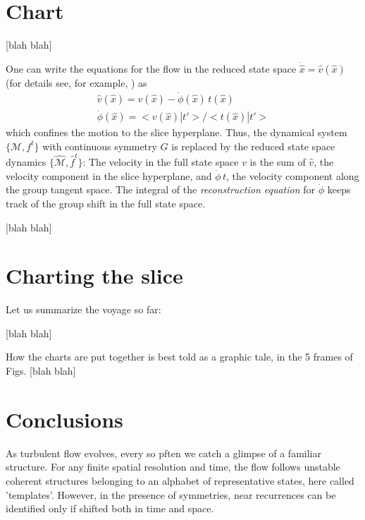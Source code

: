 \documentclass{article}
\begin{document}
\section{Chart}
\label{s:slice}

 [blah blah]

One can write the equations for the flow in the reduced state space
$\dot{\hat{x}} = \hat{v}(\hat{x})$ (for details see, for example,
\cite{DasBuch}) as
\begin{align}
\hat{v}(\hat{x}) = v(\hat{x})-\dot{\phi}(\hat{x}) \, t(\hat{x})
\label{2modesEqMotMFrame}\\
\dot{\phi}(\hat{x}) = <v(\hat{x})|t'>
                       /<t(\hat{x})|t'>
\label{2modesreconstrEq}
\end{align}
which confines the motion to the slice hyperplane. Thus, the dynamical
system $\{\mathcal{M},f^t\}$ with continuous symmetry $G$ is replaced by
the reduced state space dynamics $\{\hat{\mathcal{M}},\hat{f}^t\}$: The velocity in the
full state space $v$ is the sum of $\hat{v}$, the velocity component in
the slice hyperplane, and $\dot{\phi}\,t$, the velocity
component along the group tangent space. The integral of the {\em
reconstruction equation} for $\dot{\phi}$ keeps track of the group
shift in the full state space.


 [blah blah]

\section{Charting the slice}
\label{s:chart}

Let us summarize the voyage so far:

 [blah blah]


How the charts are put together is best told as a graphic tale, in the 5
frames of Figs.  [blah blah]



\section{Conclusions}
\label{s:concl}
As turbulent flow evolves, every so pften we catch a glimpse of a familiar structure. For any finite spatial resolution and time, the flow follows unstable coherent structures belonging to an alphabet of representative states, here called 'templates'. However, in the presence of symmetries, near recurrences can be identified only if shifted both in time and space.
\end{document}
